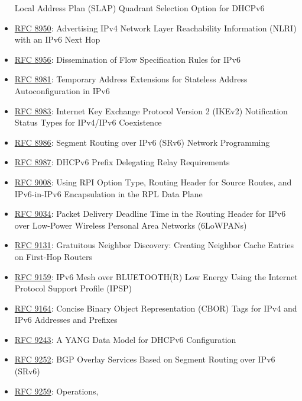 \documentclass[
]{article}
\begin{document}
\begin{itemize}
  Local Address Plan (SLAP) Quadrant Selection Option for DHCPv6
\item
  \href{https://www.rfc-editor.org/info/rfc8950}{RFC 8950}: Advertising
  IPv4 Network Layer Reachability Information (NLRI) with an IPv6 Next
  Hop
\item
  \href{https://www.rfc-editor.org/info/rfc8956}{RFC 8956}:
  Dissemination of Flow Specification Rules for IPv6
\item
  \href{https://www.rfc-editor.org/info/rfc8981}{RFC 8981}: Temporary
  Address Extensions for Stateless Address Autoconfiguration in IPv6
\item
  \href{https://www.rfc-editor.org/info/rfc8983}{RFC 8983}: Internet Key
  Exchange Protocol Version 2 (IKEv2) Notification Status Types for
  IPv4/IPv6 Coexistence
\item
  \href{https://www.rfc-editor.org/info/rfc8986}{RFC 8986}: Segment
  Routing over IPv6 (SRv6) Network Programming
\item
  \href{https://www.rfc-editor.org/info/rfc8987}{RFC 8987}: DHCPv6
  Prefix Delegating Relay Requirements
\item
  \href{https://www.rfc-editor.org/info/rfc9008}{RFC 9008}: Using RPI
  Option Type, Routing Header for Source Routes, and IPv6-in-IPv6
  Encapsulation in the RPL Data Plane
\item
  \href{https://www.rfc-editor.org/info/rfc9034}{RFC 9034}: Packet
  Delivery Deadline Time in the Routing Header for IPv6 over Low-Power
  Wireless Personal Area Networks (6LoWPANs)
\item
  \href{https://www.rfc-editor.org/info/rfc9131}{RFC 9131}: Gratuitous
  Neighbor Discovery: Creating Neighbor Cache Entries on First-Hop
  Routers
\item
  \href{https://www.rfc-editor.org/info/rfc9159}{RFC 9159}: IPv6 Mesh
  over BLUETOOTH(R) Low Energy Using the Internet Protocol Support
  Profile (IPSP)
\item
  \href{https://www.rfc-editor.org/info/rfc9164}{RFC 9164}: Concise
  Binary Object Representation (CBOR) Tags for IPv4 and IPv6 Addresses
  and Prefixes
\item
  \href{https://www.rfc-editor.org/info/rfc9243}{RFC 9243}: A YANG Data
  Model for DHCPv6 Configuration
\item
  \href{https://www.rfc-editor.org/info/rfc9252}{RFC 9252}: BGP Overlay
  Services Based on Segment Routing over IPv6 (SRv6)
\item
  \href{https://www.rfc-editor.org/info/rfc9259}{RFC 9259}: Operations,

\end{itemize}
\end{document}
